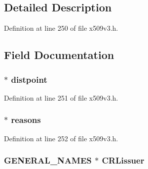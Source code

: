\subsection{Detailed Description}


Definition at line 250 of file x509v3.\+h.



\subsection{Field Documentation}
\subsubsection[{\texorpdfstring{distpoint}{distpoint}}]{ $\ast$ distpoint}\hypertarget{struct_d_i_s_t___p_o_i_n_t__st_a68c5a256dcc49ce4f3b635f9d06ae331}{}\label{struct_d_i_s_t___p_o_i_n_t__st_a68c5a256dcc49ce4f3b635f9d06ae331}


Definition at line 251 of file x509v3.\+h.

\subsubsection[{\texorpdfstring{reasons}{reasons}}]{ $\ast$ reasons}\hypertarget{struct_d_i_s_t___p_o_i_n_t__st_a858bec48e17bb85ac7e4115a5a5a34e1}{}\label{struct_d_i_s_t___p_o_i_n_t__st_a858bec48e17bb85ac7e4115a5a5a34e1}


Definition at line 252 of file x509v3.\+h.

\subsubsection[{\texorpdfstring{C\+R\+Lissuer}{CRLissuer}}]{\setlength{\rightskip}{0pt plus 5cm}G\+E\+N\+E\+R\+A\+L\+\_\+\+N\+A\+M\+ES $\ast$ C\+R\+Lissuer}\hypertarget{struct_d_i_s_t___p_o_i_n_t__st_a93694b9256dc1554100680af38a03b8f}{}\label{struct_d_i_s_t___p_o_i_n_t__st_a93694b9256dc1554100680af38a03b8f}


